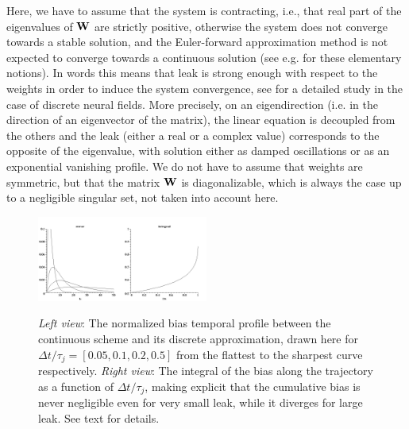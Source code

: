 Here, we have to assume that the system is contracting, i.e., that real part of the eigenvalues of ${\bf W}$ are strictly positive, otherwise the system does not converge towards a stable solution, and the Euler-forward approximation method is not expected to converge towards a continuous solution (see e.g. \cite{Press:1988} for these elementary notions).  In words this means that leak is strong enough with respect to the weights in order to induce the system convergence, see \cite{Alexandre:2009} for a detailed study in the case of discrete neural fields.  More precisely, on an eigendirection (i.e. in the direction of an eigenvector of the matrix), the linear equation is decoupled from the others and the leak (either a real or a complex value) corresponds to the opposite of the eigenvalue, with solution either as damped oscillations or as an exponential vanishing profile.  We do not have to assume that weights are symmetric, but that the matrix ${\bf W}$ is diagonalizable, which is always the case up to a negligible singular set, not taken into account here.
\begin{figure}[!htbp]
\begin{center}\includegraphics[width=0.25\textwidth]{Chapitres/PublicationsSample/Revue/fig1a.jpeg}\includegraphics[width=0.25\textwidth]{Chapitres/PublicationsSample/Revue/fig1b.jpeg}\end{center}
\caption{{\em Left view}: The normalized bias temporal profile between the continuous scheme and its discrete approximation,
drawn here for $\Delta t / \tau_j = [0.05, 0.1, 0.2, 0.5]$ from the flattest to the sharpest curve respectively.
{\em Right view}: The integral of the bias along the trajectory as a function of $\Delta t / \tau_j$, making explicit that the cumulative bias is never negligible even for very small leak, while it diverges for large leak.
See text for details.}
\label{fig:euler-error} 
\end{figure} 
